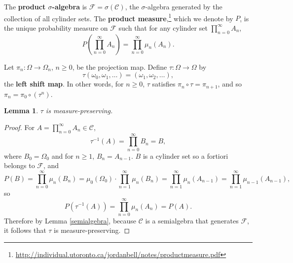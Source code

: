 \documentclass{article}
\newtheorem{lemma}[theorem]{Lemma}
\theoremstyle{definition}
\begin{document}
The \textbf{product $\sigma$-algebra}
is $\mathscr{F}=\sigma(\mathscr{C})$, the $\sigma$-algebra generated by the collection of all cylinder sets.
The \textbf{product measure},\footnote{\url{http://individual.utoronto.ca/jordanbell/notes/productmeasure.pdf}} which we denote by $P$, is the unique probability measure
on $\mathscr{F}$ such that for any cylinder set $\prod_{n=0}^\infty A_n$,
\[
P(\prod_{n=0}^\infty A_n) = \prod_{n=0}^\infty \mu_n(A_n).
\]

Let $\pi_n:\Omega \to \Omega_n$, $n \geq 0$, be the projection map. Define $\tau:\Omega \to \Omega$ by
\[
\tau(\omega_0,\omega_1,\ldots) = (\omega_1,\omega_2,\ldots),
\]
the \textbf{left shift map}.
In other words, for $n \geq 0$, $\tau$ satisfies $\pi_n \circ \tau = \pi_{n+1}$, and so
$\pi_n  = \pi_0 \circ (\tau^n)$. 

\begin{lemma}
$\tau$ is measure-preserving.
\end{lemma}
\begin{proof}
For $A=\prod_{n=0}^\infty A_n \in \mathscr{C}$, 
\[
\tau^{-1}(A) = \prod_{n=0}^\infty B_n=B,
\]
where $B_0=\Omega_0$ and for $n \geq 1$, $B_n=A_{n-1}$. $B$ is a cylinder set so a fortiori belongs to $\mathscr{F}$, and
\[
P(B) = \prod_{n=0}^\infty \mu_n(B_n) = \mu_0(\Omega_0) \cdot \prod_{n=1}^\infty \mu_n(B_n)
=\prod_{n=1}^\infty \mu_n(A_{n-1})
=\prod_{n=1}^\infty \mu_{n-1}(A_{n-1}),
\]
so
\[
P(\tau^{-1}(A)) = \prod_{n=0}^\infty \mu_n(A_n) = P(A).
\]
Therefore by Lemma \ref{semialgebra}, because
$\mathscr{C}$ is a semialgebra that generates $\mathscr{F}$, it follows that
$\tau$ is measure-preserving.
\end{proof}
\end{document}
